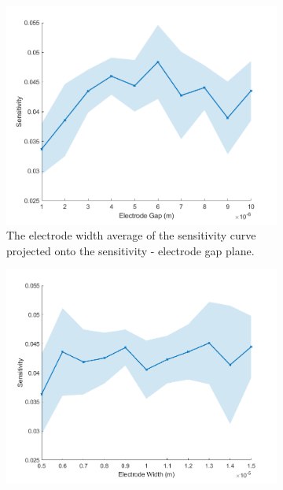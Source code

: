 \begin{figure}[h]
\begin{subfigure}[b]{0.49\textwidth}
    \end{subfigure}
    \\
    \vspace{0.1 in}
    \begin{subfigure}[b]{0.49\textwidth}
        \centering
        \includegraphics[width=\textwidth]{images/comsol_device_gapXsensitivity_aveError.png}
        \caption{The electrode width average of the sensitivity curve projected onto the sensitivity - electrode gap plane.}
        \label{fig:device_sensitivity_average_width}
    \end{subfigure}
    \hfill
    \begin{subfigure}[b]{0.49\textwidth}
        \centering
        \includegraphics[width=\textwidth]{images/comsol_device_widthXsensitivity_aveError.png}

\end{subfigure}
\end{figure}
